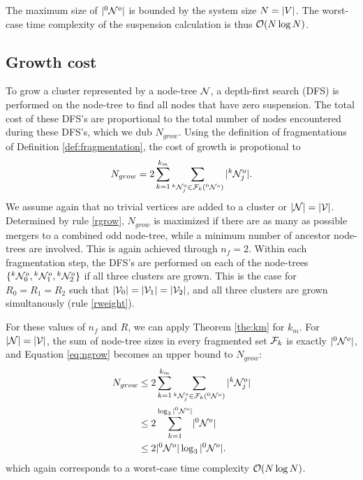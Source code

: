 The maximum size of $\lvert{}^{0}\mathcal{N}^o\rvert$ is bounded by the system size $N = \lvert V\rvert$. The worst-case time complexity of the suspension calculation is thus $\mathcal{O}(N\log{N})$. 

\subsection{Growth cost}\label{sec:growthcost}

To grow a cluster represented by a node-tree $\mathcal{N}$, a depth-first search (DFS) is performed on the node-tree to find all nodes that have zero suspension. The total cost of these DFS's are proportional to the total number of nodes encountered during these DFS's, which we dub $N_{grow}$. Using the definition of fragmentations of Definition \ref{def:fragmentation}, the cost of growth is propotional to
\begin{equation}\label{eq:ngrow}
  N_{grow} = 2\sum_{k=1}^{k_{m}}{ \sum_{ \pre{k}\nset_j^o \in \m{F}_k(\pre{0}\nset^o) }{ \abs{\pre{k}\nset_j^o} } }.
\end{equation}
We assume again that no trivial vertices are added  to a cluster or $|\mathcal{N}| = |\mathcal{V}|$. Determined by rule \ref{rgrow}, $N_{grow}$ is maximized if there are as many as possible mergers to a combined odd node-tree, while a minimum number of ancestor node-trees are involved. This is again achieved through $n_f = 2$. Within each fragmentation step, the DFS's are performed on each of the node-trees $\{{}^{k}\mathcal{N}^o_0, {}^{k}\mathcal{N}^o_1, {}^{k}\mathcal{N}^o_2\}$ if all three clusters are grown. This is the case for $R_0 = R_1 = R_2$ such that $\lvert\mathcal{V}_0\rvert= \lvert\mathcal{V}_1\rvert=\lvert\mathcal{V}_2\rvert$, and all three clusters are grown simultanously (rule \ref{rweight}). 

For these values of $n_f$ and $R$, we can apply Theorem \ref{the:km} for $k_m$. For $|\mathcal{N}| = |\mathcal{V}|$, the sum of node-tree sizes in every fragmented set $\mathcal{F}_k$ is exactly $\lvert{}^{0}\mathcal{N}^o\rvert$, and Equation \eqref{eq:ngrow} becomes an upper bound to $N_{grow}$: 
\begin{align*}
  \nonumber N_{grow} &\leq 2\sum_{k=1}^{k_{m}}{ \sum_{{}^{k}\mathcal{N}_j^o \in \mathcal{F}_k({}^{0}\mathcal{N}^o)}{ \lvert{}^{k}\mathcal{N}_j^o\rvert } } \\
  \nonumber         &\leq 2\sum_{k=1}^{\log_3{\lvert{}^{0}\mathcal{N}^o\rvert}} \lvert{}^{0}\mathcal{N}^o\rvert\\
                    &\leq 2\lvert{}^{0}\mathcal{N}^o\rvert\log_3{\lvert{}^{0}\mathcal{N}^o\rvert}.
\end{align*}
which again corresponds to a worst-case time complexity $\mathcal{O}(N\log{N})$.
